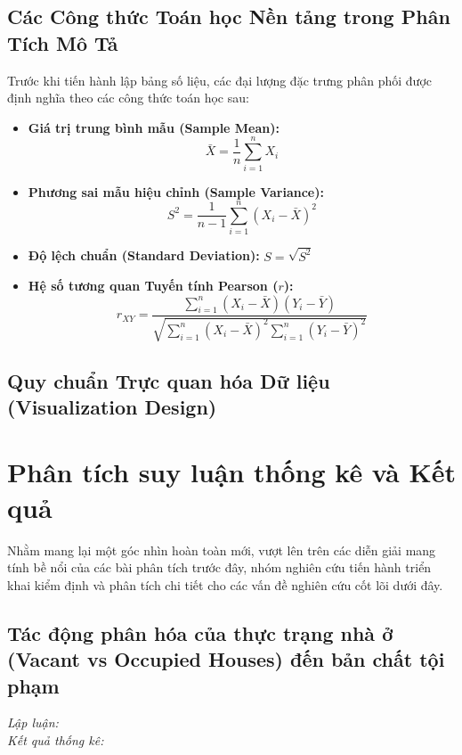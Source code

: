 \documentclass[conference]{IEEEtran}
\begin{document}
\subsection{Các Công thức Toán học Nền tảng trong Phân Tích Mô Tả}
Trước khi tiến hành lập bảng số liệu, các đại lượng đặc trưng phân phối được định nghĩa theo các công thức toán học sau:
\begin{itemize}
    \item \textbf{Giá trị trung bình mẫu (Sample Mean):}
    \begin{equation}
    \bar{X} = \frac{1}{n} \sum_{i=1}^{n} X_i
    \end{equation}
    \item \textbf{Phương sai mẫu hiệu chỉnh (Sample Variance):}
    \begin{equation}
    S^2 = \frac{1}{n-1} \sum_{i=1}^{n} (X_i - \bar{X})^2
    \end{equation}
    \item \textbf{Độ lệch chuẩn (Standard Deviation):} $S = \sqrt{S^2}$
    \item \textbf{Hệ số tương quan Tuyến tính Pearson ($r$):}
    \begin{equation}
    r_{XY} = \frac{\sum_{i=1}^{n} (X_i - \bar{X})(Y_i - \bar{Y})}{\sqrt{\sum_{i=1}^{n} (X_i - \bar{X})^2 \sum_{i=1}^{n} (Y_i - \bar{Y})^2}}
    \end{equation}
\end{itemize}

\subsection{Quy chuẩn Trực quan hóa Dữ liệu (Visualization Design)}

\section{Phân tích suy luận thống kê và Kết quả}

Nhằm mang lại một góc nhìn hoàn toàn mới, vượt lên trên các diễn giải mang tính bề nổi của các bài phân tích trước đây, nhóm nghiên cứu tiến hành triển khai kiểm định và phân tích chi tiết cho các vấn đề nghiên cứu cốt lõi dưới đây.

\subsection{Tác động phân hóa của thực trạng nhà ở (Vacant vs Occupied Houses) đến bản chất tội phạm}
\textit{Lập luận:}
\\
\textit{Kết quả thống kê:} 
\end{document}
